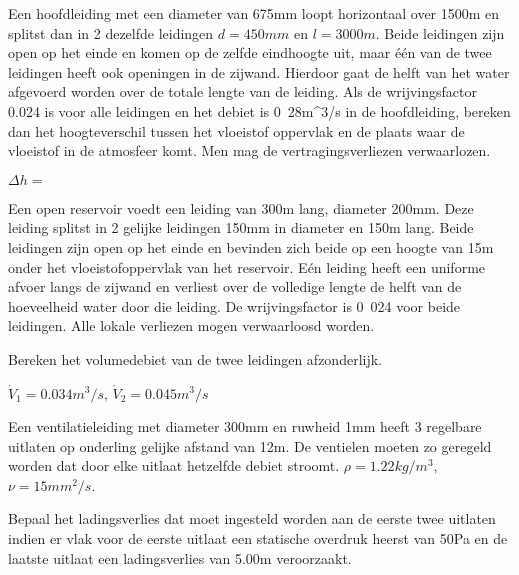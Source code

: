 \begin{toepassing}
	\label{hoogteverschil}
Een hoofdleiding met een diameter van \unit{675}{mm} loopt horizontaal over \unit{1500}{m} en splitst dan in 2 dezelfde leidingen $d=\unit{450}{mm}$ en $l=\unit{3000}{m}$. Beide leidingen zijn open op het einde en komen op de zelfde eindhoogte uit, maar één van de twee leidingen heeft ook openingen in de zijwand. Hierdoor gaat de helft van het water afgevoerd worden over de totale lengte van de leiding.
	Als de wrijvingsfactor 0.024 is voor alle leidingen en het debiet is \unit{0.28}{m^3/s} in de hoofdleiding, bereken dan het hoogteverschil tussen het vloeistof oppervlak en de plaats waar de vloeistof in de atmosfeer komt. Men mag de vertragingsverliezen verwaarlozen.
\end{toepassing}
\begin{antwoord}
	$\Delta h = $
\end{antwoord}
\begin{toepassing}
	\label{geperforeerde leiding}
Een open reservoir voedt een leiding van \unit{300}{m} lang, diameter \unit{200}{mm}. Deze leiding splitst in 2 gelijke leidingen \unit{150}{mm} in diameter en \unit{150}{m} lang. Beide leidingen zijn open op het einde en bevinden zich beide op een hoogte van \unit{15}{m} onder het vloeistofoppervlak van het reservoir. E\'en leiding heeft een uniforme afvoer langs de zijwand en verliest over de volledige lengte de helft van de hoeveelheid water door die leiding. De wrijvingsfactor is \unit{0.024}{} voor beide leidingen. Alle lokale verliezen mogen verwaarloosd worden.
		
	Bereken het volumedebiet van de twee leidingen afzonderlijk. 
\end{toepassing}
\begin{antwoord}
	$\dot{V}_1 = \unit{0.034}{m^3/s}$, $\dot{V}_2 = \unit{0.045}{m^3/s}$
\end{antwoord}
\begin{toepassing}
	\label{3uitlaten}
Een ventilatieleiding met diameter 300mm en ruwheid 1mm heeft 3 regelbare uitlaten op onderling gelijke afstand van 12m. De ventielen moeten zo geregeld worden dat door elke uitlaat hetzelfde debiet stroomt. $\rho = \unit{1.22}{kg/m^3}$, $\nu = \unit{15}{mm^2/s}$.
	
	Bepaal het ladingsverlies dat moet ingesteld worden aan de eerste twee uitlaten indien er vlak voor de eerste uitlaat een statische overdruk heerst van 50Pa en de laatste uitlaat een ladingsverlies van 5.00m veroorzaakt.
	\begin{center}
		
	\end{center}
\end{toepassing}
